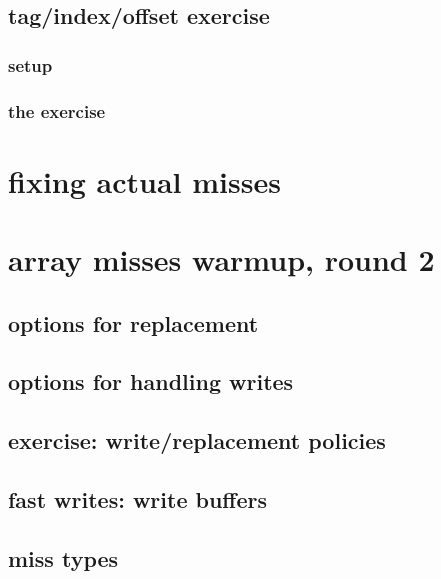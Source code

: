 \subsection{tag/index/offset exercise}
\subsubsection{setup}

\subsubsection{the exercise}


\section{fixing actual misses}


\section{array misses warmup, round 2}



\subsection{options for replacement}


\subsection{options for handling writes}


\subsection{exercise: write/replacement policies}


\subsection{fast writes: write buffers}


\subsection{miss types}


